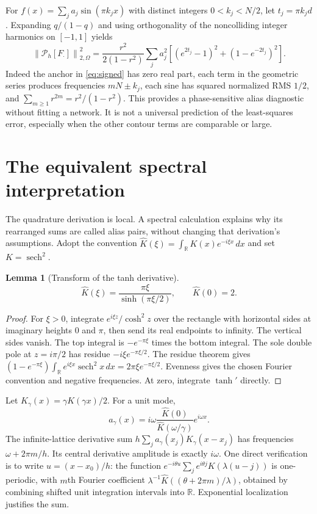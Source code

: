 \documentclass[11pt]{article}
\newtheorem{lemma}[theorem]{Lemma}
\theoremstyle{definition}\newtheorem{definition}[theorem]{Definition}
\theoremstyle{remark}\newtheorem{remark}[theorem]{Remark}
\numberwithin{equation}{section}
\DeclareMathOperator{\sech}{sech}
\newcommand{\R}{\mathbb R}
\newcommand{\norm}[1]{\left\lVert#1\right\rVert}
\newcommand{\Perr}{\mathcal P_h}
\begin{document}
For $f(x)=\sum_ja_j\sin(\pi k_jx)$ with distinct integers $0<k_j<N/2$, let $t_j=\pi k_jd$. Expanding $q/(1-q)$ and using orthogonality of the noncolliding integer harmonics on $[-1,1]$ yields
\begin{equation}
 \norm{\Perr[F_\cdot]}_{2,\Omega}^{2}
 =\frac{r^2}{2(1-r^2)}\sum_ja_j^2
 \left[(e^{2t_j}-1)^2+(1-e^{-2t_j})^2\right].
 \label{eq:signed-rms}
\end{equation}
Indeed the anchor in \eqref{eq:signed} has zero real part, each term in the geometric series produces frequencies $mN\pm k_j$, each sine has squared normalized RMS $1/2$, and $\sum_{m\ge1}r^{2m}=r^2/(1-r^2)$. This provides a phase-sensitive alias diagnostic without fitting a network. It is not a universal prediction of the least-squares error, especially when the other contour terms are comparable or large.

\section{The equivalent spectral interpretation}
\label{sec:spectral}
The quadrature derivation is local. A spectral calculation explains why its rearranged sums are called alias pairs, without changing that derivation's assumptions. Adopt the convention
$\widehat K(\xi)=\int_\R K(x)e^{-i\xi x}\,dx$ and set $K=\sech^2$.

\begin{lemma}[Transform of the tanh derivative]
\begin{equation}
 \widehat K(\xi)=\frac{\pi\xi}{\sinh(\pi\xi/2)},\qquad \widehat K(0)=2.
 \label{eq:transform}
\end{equation}
\end{lemma}
\begin{proof}
For $\xi>0$, integrate $e^{i\xi z}/\cosh^2z$ over the rectangle with horizontal sides at imaginary heights $0$ and $\pi$, then send its real endpoints to infinity. The vertical sides vanish. The top integral is $-e^{-\pi\xi}$ times the bottom integral. The sole double pole at $z=i\pi/2$ has residue $-i\xi e^{-\pi\xi/2}$. The residue theorem gives
$(1-e^{-\pi\xi})\int_\R e^{i\xi x}\sech^2x\,dx=2\pi\xi e^{-\pi\xi/2}$.
Evenness gives the chosen Fourier convention and negative frequencies. At zero, integrate $\tanh'$ directly.
\end{proof}

Let $K_\gamma(x)=\gamma K(\gamma x)/2$. For a unit mode,
\[
 a_\gamma(x)=i\omega\frac{\widehat K(0)}{\widehat K(\omega/\gamma)}e^{i\omega x}.
\]
The infinite-lattice derivative sum $h\sum_j a_\gamma(x_j)K_\gamma(x-x_j)$ has frequencies $\omega+2\pi m/h$. Its central derivative amplitude is exactly $i\omega$. One direct verification is to write $u=(x-x_0)/h$: the function
$e^{-i\theta u}\sum_je^{i\theta j}K(\lambda(u-j))$ is one-periodic, with $m$th Fourier coefficient $\lambda^{-1}\widehat K((\theta+2\pi m)/\lambda)$, obtained by combining shifted unit integration intervals into $\R$. Exponential localization justifies the sum.
\end{document}
